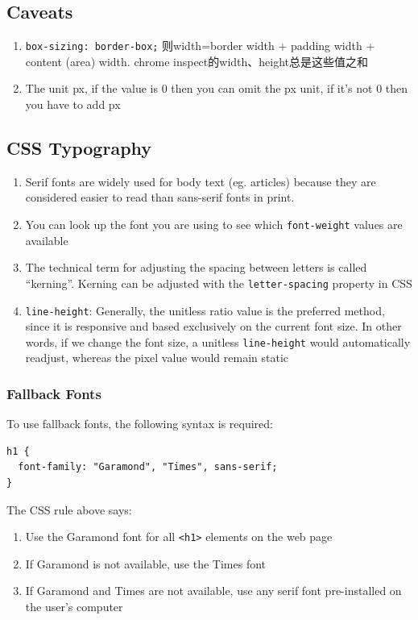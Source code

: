 \documentclass[a4paper, 12pt]{article}
\begin{document}
\subsection{Caveats}
\begin{enumerate}

\item {\color{red}\verb|box-sizing: border-box;|} 则width=border width + padding width + content (area) width. chrome inspect的width、height总是这些值之和

\item The unit px, if the value is 0 then you can omit the px unit, if it's not 0 then you have to add px

\end{enumerate}


\subsection{CSS Typography}
\begin{enumerate}

\item Serif fonts are widely used for body text (eg. articles) because they are considered easier to read than sans-serif fonts in print.

\item You can look up the font you are using to see which \verb|font-weight| values are available

\item The technical term for adjusting the spacing between letters is called ``kerning''. Kerning can be adjusted with the \verb|letter-spacing| property in CSS

\item \verb|line-height|: Generally, the unitless ratio value is the preferred method, since it is responsive and based exclusively on the current font size. In other words, if we change the font size, a unitless \verb|line-height| would automatically readjust, whereas the pixel value would remain static

\end{enumerate}

\subsubsection{Fallback Fonts}
To use fallback fonts, the following syntax is required:
\begin{verbatim}
h1 {
  font-family: "Garamond", "Times", sans-serif;
}
\end{verbatim}
The CSS rule above says:
\begin{enumerate}
\item Use the Garamond font for all \verb|<h1>| elements on the web page

\item If Garamond is not available, use the Times font

\item If Garamond and Times are not available, use any serif font pre-installed on the user's computer

\end{enumerate}
\end{document}
